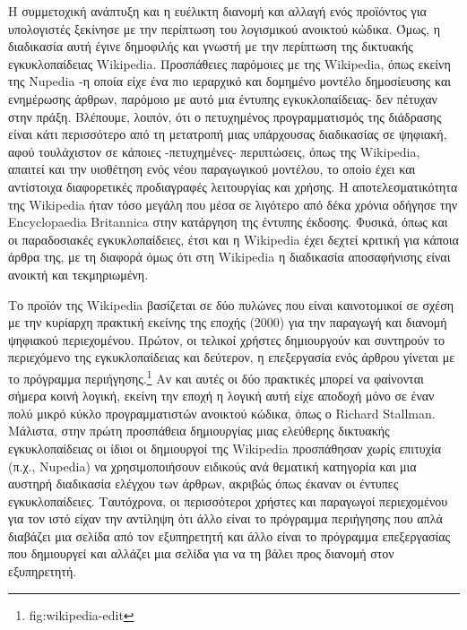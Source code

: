 \documentclass[
]{article}
\begin{document}
Η συμμετοχική ανάπτυξη και η ευέλικτη διανομή και αλλαγή ενός προϊόντος
για υπολογιστές ξεκίνησε με την περίπτωση του λογισμικού ανοικτού
κώδικα. Όμως, η διαδικασία αυτή έγινε δημοφιλής και γνωστή με την
περίπτωση της δικτυακής εγκυκλοπαίδειας Wikipedia. Προσπάθειες παρόμοιες
με της Wikipedia, όπως εκείνη της Nupedia -η οποία είχε ένα πιο
ιεραρχικό και δομημένο μοντέλο δημοσίευσης και ενημέρωσης άρθρων,
παρόμοιο με αυτό μια έντυπης εγκυκλοπαίδειας- δεν πέτυχαν στην πράξη.
Βλέπουμε, λοιπόν, ότι ο πετυχημένος προγραμματισμός της διάδρασης είναι
κάτι περισσότερο από τη μετατροπή μιας υπάρχουσας διαδικασίας σε
ψηφιακή, αφού τουλάχιστον σε κάποιες -πετυχημένες- περιπτώσεις, όπως της
Wikipedia, απαιτεί και την υιοθέτηση ενός νέου παραγωγικού μοντέλου, το
οποίο έχει και αντίστοιχα διαφορετικές προδιαγραφές λειτουργίας και
χρήσης. Η αποτελεσματικότητα της Wikipedia ήταν τόσο μεγάλη που μέσα σε
λιγότερο από δέκα χρόνια οδήγησε την Encyclopaedia Britannica στην
κατάργηση της έντυπης έκδοσης. Φυσικά, όπως και οι παραδοσιακές
εγκυκλοπαίδειες, έτσι και η Wikipedia έχει δεχτεί κριτική για κάποια
άρθρα της, με τη διαφορά όμως ότι στη Wikipedia η διαδικασία
αποσαφήνισης είναι ανοικτή και τεκμηριωμένη.

Το προϊόν της Wikipedia βασίζεται σε δύο πυλώνες που είναι καινοτομικοί
σε σχέση με την κυρίαρχη πρακτική εκείνης της εποχής (2000) για την
παραγωγή και διανομή ψηφιακού περιεχομένου. Πρώτον, οι τελικοί χρήστες
δημιουργούν και συντηρούν το περιεχόμενο της εγκυκλοπαίδειας και
δεύτερον, η επεξεργασία ενός άρθρου γίνεται με το πρόγραμμα
περιήγησης.\footnote{fig:wikipedia-edit} Αν και αυτές οι δύο πρακτικές
μπορεί να φαίνονται σήμερα κοινή λογική, εκείνη την εποχή η λογική αυτή
είχε αποδοχή μόνο σε έναν πολύ μικρό κύκλο προγραμματιστών ανοικτού
κώδικα, όπως ο Richard Stallman. Μάλιστα, στην πρώτη προσπάθεια
δημιουργίας μιας ελεύθερης δικτυακής εγκυκλοπαίδειας οι ίδιοι οι
δημιουργοί της Wikipedia προσπάθησαν χωρίς επιτυχία (π.χ., Nupedia) να
χρησιμοποιήσουν ειδικούς ανά θεματική κατηγορία και μια αυστηρή
διαδικασία ελέγχου των άρθρων, ακριβώς όπως έκαναν οι έντυπες
εγκυκλοπαίδειες. Ταυτόχρονα, οι περισσότεροι χρήστες και παραγωγοί
περιεχομένου για τον ιστό είχαν την αντίληψη ότι άλλο είναι το πρόγραμμα
περιήγησης που απλά διαβάζει μια σελίδα από τον εξυπηρετητή και άλλο
είναι το πρόγραμμα επεξεργασίας που δημιουργεί και αλλάζει μια σελίδα
για να τη βάλει προς διανομή στον εξυπηρετητή.
\end{document}
